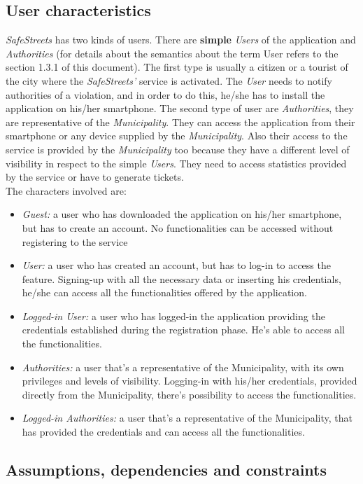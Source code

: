 \documentclass {article}
\begin{document}
	\subsection{User characteristics}
	{\it SafeStreets} has two kinds of users. There are  {\bf simple }{\it Users} of the application and {\it Authorities} (for details about the semantics about the term User refers to the section 1.3.1 of this document). The first type is usually a citizen or a tourist of the city where the {\it SafeStreets'} service is activated. The {\it User} needs to notify authorities of a violation,  and in order to do this, he/she has to install the application on his/her smartphone. The second type of user are {\it Authorities}, they are representative of the {\it Municipality}. They can access the application from their smartphone or any device supplied by the {\it Municipality}. Also their access to the service is provided by the {\it Municipality} too because they have a different level of visibility in respect to the simple {\it Users}. They need to access statistics provided by the service or have to generate tickets. \\
	The characters involved are:
	\begin{itemize}
		\item {\it Guest:} a user who has downloaded the application on his/her smartphone, but has to create an account. No functionalities can be accessed without registering to the service
		\item {\it User:} a user who has created an account, but has to log-in to access the feature. Signing-up with all the necessary data or inserting his credentials, he/she can access all the functionalities offered by the application.
		\item {\it Logged-in User:} a user who has logged-in the application providing the credentials established during the registration phase. He's able to access all the functionalities. 
		\item {\it Authorities:} a user that's a representative of the Municipality, with its own privileges and levels of visibility. Logging-in with his/her credentials, provided directly from the Municipality, there's possibility to access the functionalities.
		\item {\it Logged-in Authorities:} a user that's a representative of the Municipality, that has provided the credentials and can access all the functionalities.
	\end{itemize}
	
	\subsection{Assumptions, dependencies and constraints}
\end{document}
